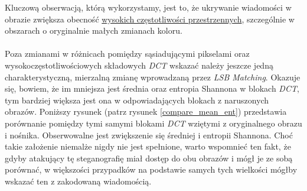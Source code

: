 \documentclass[a4paper,12pt]{article}
\begin{document}
        Kluczową obserwacją, którą wykorzystamy, jest to, że ukrywanie wiadomości w obrazie zwiększa obecność \underline{wysokich częstotliwości przestrzennych}, szczególnie w obszarach o oryginalnie małych zmianach koloru. \\
        \\
        Poza zmianami w różnicach pomiędzy sąsiadującymi pikselami oraz wysokoczęstotliwościowych składowych \textit{DCT} wskazać należy jeszcze jedną charakterystyczną, mierzalną zmianę wprowadzaną przez \textit{LSB Matching}. Okazuje się, bowiem, że im mniejsza jest średnia oraz entropia Shannona w blokach \textit{DCT}, tym bardziej większa jest ona w odpowiadających blokach z naruszonych obrazów. Poniższy rysunek (patrz rysunek \ref{compare_mean_ent}) przedstawia porównanie pomiędzy tymi samymi blokami \textit{DCT} wziętymi z oryginalnego obrazu i nośnika. Obserwowalne jest zwiększenie się średniej i entropii Shannona. Choć takie założenie niemalże nigdy nie jest spełnione, warto wspomnieć ten fakt, że gdyby atakujący tę steganografię miał dostęp do obu obrazów i mógł je ze sobą porównać, w większości przypadków na podstawie samych tych wielkości mógłby wskazać ten z zakodowaną wiadomością.
\end{document}
